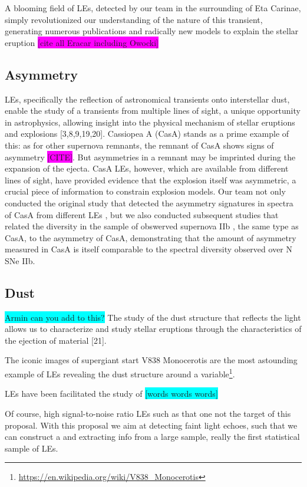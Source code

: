 \documentclass{proposalnsf}
\newcommand{\armin}[1]{\colorbox{cyan}{#1}}
\newcommand{\changeit}[1]{\colorbox{magenta}{#1}}
\begin{document}
A blooming field of LEs, detected by our team in the surrounding of Eta Carinae, simply revolutionized our understanding of the nature of this transient, generating numerous publications and radically new models to explain the stellar eruption \changeit{[cite all Eracar including Owocki]}

\subsection{Asymmetry}
LEs, specifically the reflection of astronomical transients onto interstellar dust, enable the study of a transients from multiple lines of sight, a unique opportunity in astrophysics, allowing insight into the physical mechanism of stellar eruptions and explosions [3,8,9,19,20].  Cassiopea A (CasA) stands as a prime example of this: as for other supernova remnants, the remnant of CasA shows signs of asymmetry \changeit{[CITE]}.  But asymmetries in a remnant may be imprinted during the expansion of the ejecta.  CasA LEs, however, which are available from different lines of sight, have provided evidence that the explosion itself was asymmetric, a crucial piece of information to constrain explosion models.  Our team not only conducted the original study that detected the asymmetry signatures in spectra of CasA from different LEs \tochange[RESTCASA], but we also conducted subsequent studies that related the diversity in the sample of obswerved supernova IIb \tochange[Finn], the same type as CasA, to the asymmetry of CasA, demonstrating that the amount of asymmetry measured in CasA is itself comparable to the spectral diversity observed over N SNe IIb.

\subsection{Dust}
\armin{Armin can you add to this?}
The study of the dust structure that reflects the light allows us to characterize and study stellar eruptions through the characteristics of the ejection of material [21].

The iconic images of supergiant start V838 Monocerotis are the most astounding example of LEs revealing the dust structure around a variable\footnote{\url{https://en.wikipedia.org/wiki/V838_Monocerotis}}. 

LEs have been facilitated the study of \armin{[words words words]}

Of course, high signal-to-noise ratio LEs such as that one not the target of this proposal. With this proposal we aim at detecting faint light echoes, such that we can construct a and extracting info from a large sample, really the first statistical sample of LEs. 
\end{document}
